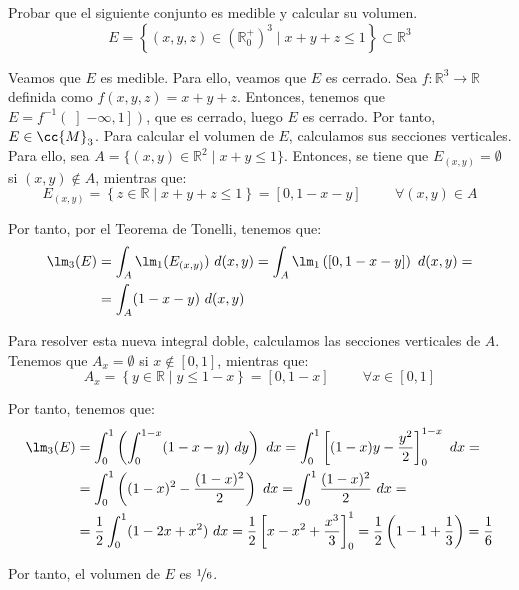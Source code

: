 \begin{ejercicio}
    Probar que el siguiente conjunto es medible y calcular su volumen.
    \[ E = \left\{ (x, y, z) \in \left(\mathbb{R}^+_0\right)^3 \mid x + y + z \leq 1 \right\} \subset \mathbb{R}^3 \]

    Veamos que $E$ es medible. Para ello, veamos que $E$ es cerrado. Sea $f:\mathbb{R}^3\to\mathbb{R}$ definida como $f(x,y,z)=x+y+z$.
    Entonces, tenemos que $E=f^{-1}\left(\left]-\infty,1\right]\right)$, que es cerrado, luego $E$ es cerrado. Por tanto, $E\in \cc{M}_3$.
    Para calcular el volumen de $E$, calculamos sus secciones verticales. Para ello, sea $A=\{(x,y)\in \mathbb{R}^2 \mid x+y\leq 1\}$. Entonces,
    se tiene que $E_{(x,y)}=\emptyset$ si $(x,y)\notin A$, mientras que:
    \begin{equation*}
        E_{(x,y)} = \left\{ z\in \mathbb{R} \mid x+y+z\leq 1 \right\} = \left[ 0, 1-x-y \right] \hspace{1cm} \forall (x,y)\in A
    \end{equation*}

    Por tanto, por el Teorema de Tonelli, tenemos que:
    \begin{align*}
        \lm_3(E) &= \int_A \lm_1(E_{(x,y)})~d(x,y)
        = \int_A \lm_1\left( \left[ 0, 1-x-y \right] \right)~d(x,y) =\\
        &= \int_A (1-x-y)~d(x,y)
    \end{align*}

    Para resolver esta nueva integral doble, calculamos las secciones verticales de $A$. Tenemos que
    $A_x=\emptyset$ si $x\notin \left[0,1\right]$, mientras que:
    \begin{equation*}
        A_x = \left\{ y\in \mathbb{R} \mid y\leq 1-x \right\} = \left[ 0, 1-x \right] \hspace{1cm} \forall x\in \left[0,1\right]
    \end{equation*}

    Por tanto, tenemos que:
    \begin{align*}
        \lm_3(E) &= \int_{0}^{1} \left( \int_{0}^{1-x} (1-x-y)~dy \right)~dx
        = \int_{0}^{1} \left[ (1-x)y -\dfrac{y^2}{2} \right]_{0}^{1-x}~dx =\\
        &= \int_{0}^{1} \left( (1-x)^2-\dfrac{(1-x)^2}{2} \right)~dx
        = \int_{0}^{1}\dfrac{(1-x)^2}{2}~dx =\\
        &= \dfrac{1}{2}\int_{0}^{1} (1-2x+x^2)~dx
        = \dfrac{1}{2}\left[ x-x^2+\dfrac{x^3}{3} \right]_{0}^{1} = \dfrac{1}{2}\left( 1-1+\dfrac{1}{3} \right) = \dfrac{1}{6}
    \end{align*}

    Por tanto, el volumen de $E$ es $\nicefrac{1}{6}$.
\end{ejercicio}
    

